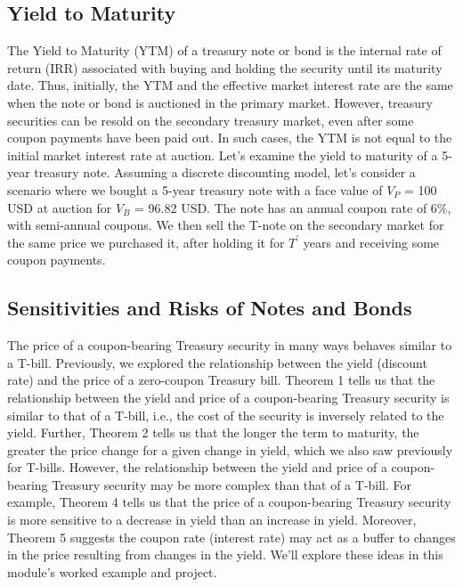 \documentclass[11pt]{article}
\theoremstyle{definition}
\begin{document}
\subsection{Yield to Maturity}
The Yield to Maturity (YTM) of a treasury note or bond is the internal rate of return (IRR) associated with buying and holding the security until its maturity date. 
Thus, initially, the YTM and the effective market interest rate are the same when the note or bond is auctioned in the primary market. 
However, treasury securities can be resold on the secondary treasury market, even after some coupon payments have been paid out. 
In such cases, the YTM is not equal to the initial market interest rate at auction. Let's examine the yield to maturity of a 5-year treasury note. Assuming a discrete discounting model, 
let's consider a scenario where we bought a 5-year treasury note with a face value of $V_{P}$ = 100 USD at auction for $V_{B}$ = 96.82 USD. 
The note has an annual coupon rate of 6\%, with semi-annual coupons. We then sell the T-note on the secondary market for the same price we purchased it, 
after holding it for $T^{\prime}$ years and receiving some coupon payments.

\subsection{Sensitivities and Risks of Notes and Bonds}
The price of a coupon-bearing Treasury security in many ways behaves similar to a T-bill.
Previously, we explored the relationship between the yield (discount rate) and the price of a zero-coupon Treasury bill. 
Theorem 1 tells us that the relationship between the yield and price of a coupon-bearing Treasury security is similar to that of a T-bill, i.e., the cost of the security is inversely related to the yield.
Further, Theorem 2 tells us that the longer the term to maturity, the greater the price change for a given change in yield, which we also saw previously for T-bills.
However, the relationship between the yield and price of a coupon-bearing Treasury security may be more complex than that of a T-bill. For example, Theorem 4 tells us that the price of a coupon-bearing Treasury security is more sensitive to a decrease in yield than an increase in yield. Moreover, Theorem 5 suggests the coupon rate (interest rate) may act as a buffer to changes in the price resulting from changes in the yield. We'll explore these ideas in this module's worked example and project.
\end{document}
